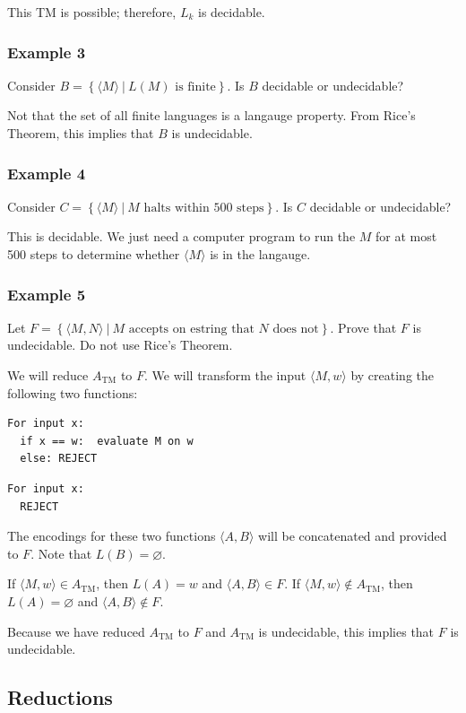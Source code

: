 This TM is possible; therefore, $L_k$ is decidable.

\subsubsection{Example 3}
Consider $B = \left\{\langle M \rangle ~|~ L(M) \textrm{ is
finite}\right\}$. Is $B$ decidable or undecidable?

Not that the set of all finite languages is a langauge property. From
Rice's Theorem, this implies that $B$ is undecidable.

\subsubsection{Example 4}
Consider $C = \left\{\langle M \rangle ~|~ M \textrm{ halts within 500
steps}\right\}$. Is $C$ decidable or undecidable?

This is decidable. We just need a computer program to run the $M$ for at
most 500 steps to determine whether $\langle M \rangle$ is in the
langauge.
\subsubsection{Example 5}
Let $F = \left\{\langle M, N \rangle ~|~ M \textrm{ accepts on estring
that } N \textrm{ does not}\right\}$. Prove that $F$ is undecidable. Do
not use Rice's Theorem.

We will reduce $A_{\textrm{TM}}$ to $F$. We will transform the input $\langle M, w \rangle$ by creating the following two functions:
\begin{verbatim}
For input x:
  if x == w:  evaluate M on w
  else: REJECT
\end{verbatim}
\begin{verbatim}
For input x:
  REJECT
\end{verbatim}
The encodings for these two functions $\langle A, B \rangle$ will be
concatenated and provided to $F$. Note that $L(B) = \varnothing$.

If $\langle M, w \rangle \in A_{\textrm{TM}}$, then $L(A) = w$ and
$\langle A, B \rangle\in F$. If $\langle M,w \rangle\notin
A_{\textrm{TM}}$, then $L(A) = \varnothing$ and $\langle A, B
\rangle\notin F$.

Because we have reduced $A_{\textrm{TM}}$ to $F$ and $A_{\textrm{TM}}$
is undecidable, this implies that $F$ is undecidable.

\subsection{Reductions}

